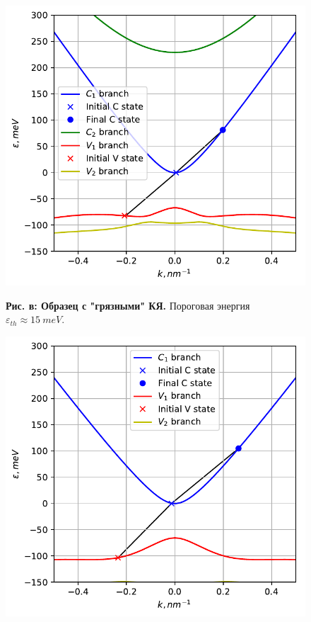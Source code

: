 \documentclass[../main.tex]{subfiles}
\begin{document}
        \begin{figure}[h!]
            \begin{minipage}[h]{0.49\linewidth}
                \begin{center}
                    \includegraphics[width=1.\linewidth]{./images/18u_impure_40K.pdf}
    
                    \textbf{Рис. в: Образец с "грязными" КЯ.} Пороговая энергия 
                        $\varepsilon_{th} \approx 15~meV$.
                \end{center}
            \end{minipage}
            \hfill
            \begin{minipage}[h]{0.49\linewidth}
                \begin{center}
                    \includegraphics[width=1.\linewidth]{./images/18u_pure_40K.pdf}
    

\end{center}
\end{minipage}
\end{figure}
\end{document}
